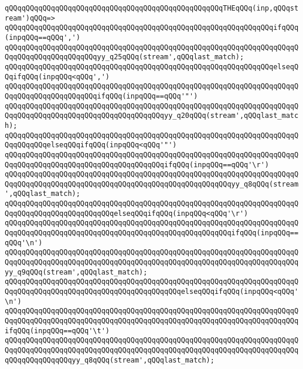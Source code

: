 \verb|qQQqqQQqqQQqqQQqqQQqqQQqqQQqqQQqqQQqqQQqqQQqqQQqqQQqTHEqQQq(inp,qQQqstream')qQQq=>|\newline
\verb|qQQqqQQqqQQqqQQqqQQqqQQqqQQqqQQqqQQqqQQqqQQqqQQqqQQqqQQqqQQqqQQqifqQQq(inpqQQq==qQQq',')|\newline
\verb|qQQqqQQqqQQqqQQqqQQqqQQqqQQqqQQqqQQqqQQqqQQqqQQqqQQqqQQqqQQqqQQqqQQqqQQqqQQqqQQqqQQqqQQqqQQqyy_q25qQQq(stream',qQQqlast_match);|\newline
\verb|qQQqqQQqqQQqqQQqqQQqqQQqqQQqqQQqqQQqqQQqqQQqqQQqqQQqqQQqqQQqqQQqelseqQQqifqQQq(inpqQQq<qQQq',')|\newline
\verb|qQQqqQQqqQQqqQQqqQQqqQQqqQQqqQQqqQQqqQQqqQQqqQQqqQQqqQQqqQQqqQQqqQQqqQQqqQQqqQQqqQQqqQQqqQQqifqQQq(inpqQQq==qQQq'"')|\newline
\verb|qQQqqQQqqQQqqQQqqQQqqQQqqQQqqQQqqQQqqQQqqQQqqQQqqQQqqQQqqQQqqQQqqQQqqQQqqQQqqQQqqQQqqQQqqQQqqQQqqQQqqQQqqQQqyy_q20qQQq(stream',qQQqlast_match);|\newline
\verb|qQQqqQQqqQQqqQQqqQQqqQQqqQQqqQQqqQQqqQQqqQQqqQQqqQQqqQQqqQQqqQQqqQQqqQQqqQQqqQQqelseqQQqifqQQq(inpqQQq<qQQq'"')|\newline
\verb|qQQqqQQqqQQqqQQqqQQqqQQqqQQqqQQqqQQqqQQqqQQqqQQqqQQqqQQqqQQqqQQqqQQqqQQqqQQqqQQqqQQqqQQqqQQqqQQqqQQqqQQqqQQqifqQQq(inpqQQq==qQQq'\r')|\newline
\verb|qQQqqQQqqQQqqQQqqQQqqQQqqQQqqQQqqQQqqQQqqQQqqQQqqQQqqQQqqQQqqQQqqQQqqQQqqQQqqQQqqQQqqQQqqQQqqQQqqQQqqQQqqQQqqQQqqQQqqQQqqQQqyy_q8qQQq(stream',qQQqlast_match);|\newline
\verb|qQQqqQQqqQQqqQQqqQQqqQQqqQQqqQQqqQQqqQQqqQQqqQQqqQQqqQQqqQQqqQQqqQQqqQQqqQQqqQQqqQQqqQQqqQQqqQQqelseqQQqifqQQq(inpqQQq<qQQq'\r')|\newline
\verb|qQQqqQQqqQQqqQQqqQQqqQQqqQQqqQQqqQQqqQQqqQQqqQQqqQQqqQQqqQQqqQQqqQQqqQQqqQQqqQQqqQQqqQQqqQQqqQQqqQQqqQQqqQQqqQQqqQQqqQQqqQQqifqQQq(inpqQQq==qQQq'\n')|\newline
\verb|qQQqqQQqqQQqqQQqqQQqqQQqqQQqqQQqqQQqqQQqqQQqqQQqqQQqqQQqqQQqqQQqqQQqqQQqqQQqqQQqqQQqqQQqqQQqqQQqqQQqqQQqqQQqqQQqqQQqqQQqqQQqqQQqqQQqqQQqqQQqyy_q9qQQq(stream',qQQqlast_match);|\newline
\verb|qQQqqQQqqQQqqQQqqQQqqQQqqQQqqQQqqQQqqQQqqQQqqQQqqQQqqQQqqQQqqQQqqQQqqQQqqQQqqQQqqQQqqQQqqQQqqQQqqQQqqQQqqQQqqQQqelseqQQqifqQQq(inpqQQq<qQQq'\n')|\newline
\verb|qQQqqQQqqQQqqQQqqQQqqQQqqQQqqQQqqQQqqQQqqQQqqQQqqQQqqQQqqQQqqQQqqQQqqQQqqQQqqQQqqQQqqQQqqQQqqQQqqQQqqQQqqQQqqQQqqQQqqQQqqQQqqQQqqQQqqQQqqQQqifqQQq(inpqQQq==qQQq'\t')|\newline
\verb|qQQqqQQqqQQqqQQqqQQqqQQqqQQqqQQqqQQqqQQqqQQqqQQqqQQqqQQqqQQqqQQqqQQqqQQqqQQqqQQqqQQqqQQqqQQqqQQqqQQqqQQqqQQqqQQqqQQqqQQqqQQqqQQqqQQqqQQqqQQqqQQqqQQqqQQqqQQqyy_q8qQQq(stream',qQQqlast_match);|\newline
